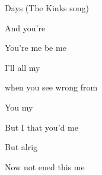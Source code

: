 \begin{SBSong}{Days (The Kinks song)}
\begin{SBVerse}
	  And  you're 

	  You're  me    be me  
    \end{SBVerse}
  \fi
  \begin{SBVerse}
 	 I'll  all my 

 	 when you  see wrong from 

	You  my 

	But  I  that   you'd  me 

	But  alrig

    Now  not ened	 this   me 
  \end{SBVerse} 
\end{SBSong}

